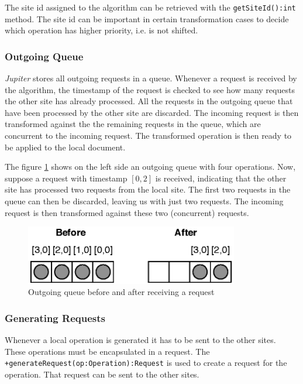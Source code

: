 The site id assigned to the algorithm can be retrieved with the
\texttt{getSiteId():int} method. The site id can be important in certain
transformation cases to decide which operation has higher priority, i.e.
is not shifted.

\subsubsection{Outgoing Queue}
\label{sect:algorithm.outgoingqueue}
\emph{Jupiter} stores all outgoing requests in a queue. Whenever a request
is received by the algorithm, the timestamp of the request is checked to
see how many requests the other site has already processed. All the requests
in the outgoing queue that have been processed by the other site are discarded.
The incoming request is then transformed against the the remaining 
requests in the queue, which are concurrent to the incoming request. 
The transformed operation is then ready to be applied to the
local document.

The figure \ref{fig:algorithm.outqueue} shows on the left side an outgoing
queue with four operations. Now, suppose a request with timestamp $[0,2]$
is received, indicating that the other site has processed two requests
from the local site. The first two requests in the queue can then be
discarded, leaving us with just two requests. The incoming request is then
transformed against these two (concurrent) requests.

\begin{figure}[H]
\centering
\includegraphics[width=9.31cm,height=2.58cm]{../images/finalreport/algorithm_outqueue.eps}
\caption{Outgoing queue before and after receiving a request}
\label{fig:algorithm.outqueue}
\end{figure}

\subsubsection{Generating Requests}
Whenever a local operation is generated it has to be sent to the other sites.
These operations must be encapsulated in a request. The
\texttt{+generate\-Request(op:Operation):Request} is used to create a request
for the operation. That request can be sent to the other sites.

